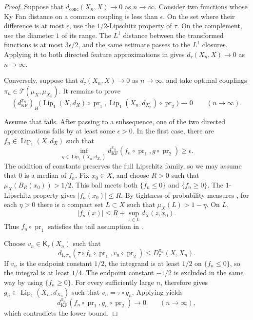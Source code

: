 \documentclass[10pt,a4paper]{amsart}
\newcommand{\T}{\mathcal T}
\newcommand{\Kc}{\mathsf K}
\newcommand{\dconc}{d_{\mathrm{conc}}}
\newcommand{\dtau}{d_{\tau}}
\newcommand{\kf}{d_{\operatorname{KF}}}
\DeclareMathOperator{\pr}{pr}
\begin{document}
\begin{proof}
Suppose that $\dconc(X_n,X)\to0$ as $n\to\infty$. Consider two functions whose Ky Fan distance on a common coupling is less than $\epsilon$. On the set where their difference is at most $\epsilon$, use the $1/2$-Lipschitz property of $\tau$. On the complement, use the diameter $1$ of its range. The $L^1$ distance between the transformed functions is at most $3\epsilon/2$, and the same estimate passes to the $L^1$ closures. Applying it to both directed feature approximations in  gives $\dtau(X_n,X)\to0$ as $n\to\infty$.

Conversely, suppose that $\dtau(X_n,X)\to0$ as $n\to\infty$, and take optimal couplings $\pi_n\in\T(\mu_X,\mu_{X_n})$. It remains to prove
\begin{equation}
\label{eq:mm-kyfan}
(\kf^{\pi_n})_H\bigl(
\operatorname{Lip}_1(X,d_X)\circ\pr_1,
\operatorname{Lip}_1(X_n,d_{X_n})\circ\pr_2
\bigr)\longrightarrow0
\qquad(n\to\infty).
\end{equation}

Assume that  fails. After passing to a subsequence, one of the two directed approximations fails by at least some $\epsilon>0$. In the first case, there are $f_n\in\operatorname{Lip}_1(X,d_X)$ such that
\[
\inf_{g\in\operatorname{Lip}_1(X_n,d_{X_n})}
\kf^{\pi_n}(f_n\circ\pr_1,g\circ\pr_2)\geq\epsilon.
\]
The addition of constants preserves the full Lipschitz family, so we may assume that $0$ is a median of $f_n$. Fix $x_0\in X$, and choose $R>0$ such that $\mu_X(B_R(x_0))>1/2$. This ball meets both $\{f_n\leq0\}$ and $\{f_n\geq0\}$. The $1$-Lipschitz property gives $|f_n(x_0)|\leq R$. By tightness of probability measures \cite[Definition~1.18 and Theorem~1.19]{shioya2016mmg}, for each $\eta>0$ there is a compact set $L\subset X$ such that $\mu_X(L)>1-\eta$. On $L$,
\[
|f_n(x)|\leq R+\sup_{z\in L}d_X(z,x_0).
\]
Thus $f_n\circ\pr_1$ satisfies the tail assumption in .

Choose $v_n\in\Kc_\tau(X_n)$ such that
\[
d_{1,\pi_n}(\tau\circ f_n\circ\pr_1,v_n\circ\pr_2)
\leq D_\tau^{\pi_n}(X,X_n).
\]
If $v_n$ is the endpoint constant $1/2$, the integrand is at least $1/2$ on $\{f_n\leq0\}$, so the integral is at least $1/4$. The endpoint constant $-1/2$ is excluded in the same way by using $\{f_n\geq0\}$. For every sufficiently large $n$,  therefore gives $g_n\in\operatorname{Lip}_1(X_n,d_{X_n})$ such that $v_n=\tau\circ g_n$. Applying  yields
\[
\kf^{\pi_n}(f_n\circ\pr_1,g_n\circ\pr_2)\longrightarrow0
\qquad(n\to\infty),
\]
which contradicts the lower bound.


\end{proof}
\end{document}
